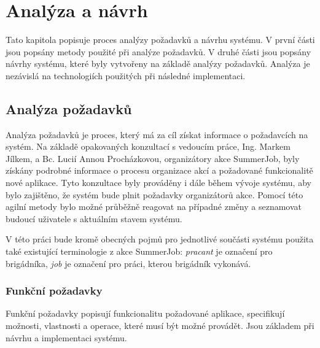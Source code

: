 \chapter{Analýza a návrh}

Tato kapitola popisuje proces analýzy požadavků a návrhu systému.
V první části jsou popsány metody použité při analýze požadavků. V druhé části jsou popsány návrhy systému, které byly vytvořeny na základě analýzy požadavků.
Analýza je nezávislá na technologiích použitých při následné implementaci.

\section{Analýza požadavků}

Analýza požadavků je proces, který má za cíl získat informace o požadavcích na systém. Na základě opakovaných konzultací s vedoucím práce, Ing. Markem Jílkem, a 
Bc. Lucií Annou Procházkovou, organizátory akce SummerJob, byly získány podrobné informace o procesu organizace akcí a požadované funkcionalitě nové aplikace.
Tyto konzultace byly prováděny i dále během vývoje systému, aby bylo zajištěno, že systém bude plnit požadavky organizátorů akce. Pomocí této agilní metody
bylo možné průběžně reagovat na případné změny a seznamovat budoucí uživatele s aktuálním stavem systému.

V této práci bude kromě obecných pojmů pro jednotlivé součásti systému použita také existující terminologie z akce SummerJob: \textit{pracant} je označení pro brigádníka, \textit{job} je označení pro práci, kterou brigádník vykonává.

\subsection{Funkční požadavky}

Funkční požadavky popisují funkcionalitu požadované aplikace, specifikují možnosti, vlastnosti a operace, které musí být možné provádět.
Jsou základem při návrhu a implementaci systému.

